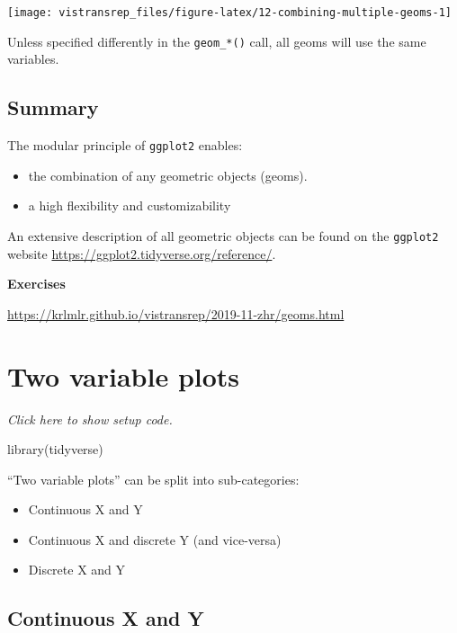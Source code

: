 \documentclass[]{book}
\newenvironment{Shaded}{}{}
\newcommand{\KeywordTok}[1]{\textcolor[rgb]{0.00,0.00,1.00}{#1}}
\newcommand{\NormalTok}[1]{#1}
\providecommand{\tightlist}{%
  \setlength{\itemsep}{0pt}\setlength{\parskip}{0pt}}
\begin{document}
\begin{flushright}\texttt{[image: vistransrep\_files/figure-latex/12-combining-multiple-geoms-1]} \end{flushright}

Unless specified differently in the \texttt{geom\_*()} call, all geoms will use the same variables.

\hypertarget{summary}{%
\subsection{Summary}\label{summary}}

The modular principle of \texttt{ggplot2} enables:

\begin{itemize}
\tightlist
\item
  the combination of any geometric objects (geoms).
\item
  a high flexibility and customizability
\end{itemize}

An extensive description of all geometric objects can be found on the \texttt{ggplot2} website \url{https://ggplot2.tidyverse.org/reference/}.

\textbf{Exercises}

\url{https://krlmlr.github.io/vistransrep/2019-11-zhr/geoms.html}

\hypertarget{two-variable-plots}{%
\section{Two variable plots}\label{two-variable-plots}}

\emph{Click here to show setup code.}

\begin{Shaded}
\begin{Highlighting}[]
\KeywordTok{library}\NormalTok{(tidyverse)}
\end{Highlighting}
\end{Shaded}

``Two variable plots'' can be split into sub-categories:

\begin{itemize}
\item
  Continuous X and Y
\item
  Continuous X and discrete Y (and vice-versa)
\item
  Discrete X and Y
\end{itemize}

\hypertarget{continuous-x-and-y}{%
\subsection{Continuous X and Y}\label{continuous-x-and-y}}
\end{document}
